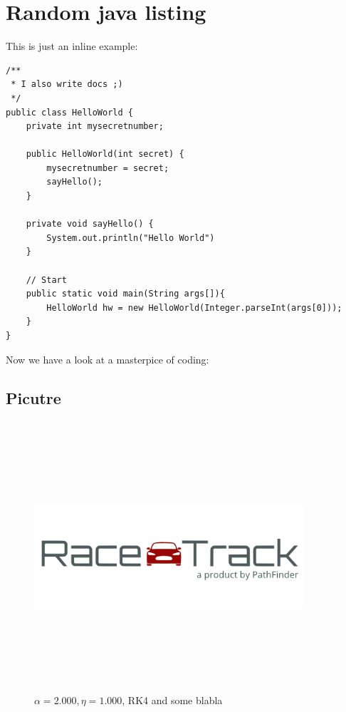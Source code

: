 \section{Random java listing}
This is just an inline example:
	\begin{lstlisting}[style=java,caption={A funny little listing example}]
/**
 * I also write docs ;)
 */
public class HelloWorld {
	private int mysecretnumber;

	public HelloWorld(int secret) {
		mysecretnumber = secret;
		sayHello();
	}

	private void sayHello() {
		System.out.println("Hello World")
	}

	// Start
	public static void main(String args[]){
		HelloWorld hw = new HelloWorld(Integer.parseInt(args[0]));
	}
}
	\end{lstlisting}

Now we have a look at a masterpice of coding:

\subsection{Picutre}


\begin{figure}[H]
	\centering
	\includegraphics[width=10cm,height=10cm,keepaspectratio,center]{img/RaceTrack_Logo.png}
	\caption{$\alpha = 2.000, \eta = 1.000$, RK4 and some blabla}
\end{figure}

